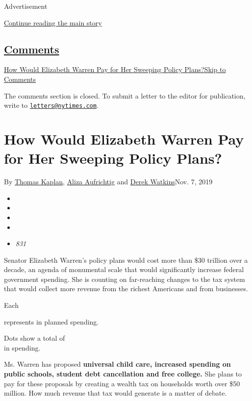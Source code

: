 Advertisement

\protect\hyperlink{after-top}{Continue reading the main story}

\hypertarget{comments}{%
\subsection{\texorpdfstring{\protect\hyperlink{commentsContainer}{Comments}}{Comments}}\label{comments}}

\href{}{How Would Elizabeth Warren Pay for Her Sweeping Policy
Plans?}\href{}{Skip to Comments}

The comments section is closed. To submit a letter to the editor for
publication, write to
\href{mailto:letters@nytimes.com}{\nolinkurl{letters@nytimes.com}}.

\hypertarget{how-would-elizabeth-warren-pay-for-her-sweeping-policy-plans}{%
\section{How Would Elizabeth Warren Pay for Her Sweeping Policy
Plans?}\label{how-would-elizabeth-warren-pay-for-her-sweeping-policy-plans}}

By \href{https://www.nytimes.com/by/thomas-kaplan}{Thomas Kaplan},
\href{https://www.nytimes.com/by/aliza-aufrichtig}{Aliza Aufrichtig} and
\href{https://www.nytimes.com/by/derek-watkins}{Derek Watkins}Nov. 7,
2019

\begin{itemize}
\item
\item
\item
\item
\item
  \emph{831}
\end{itemize}

Senator Elizabeth Warren's policy plans would cost more than \$30
trillion over a decade, an agenda of monumental scale that would
significantly increase federal government spending. She is counting on
far-reaching changes to the tax system that would collect more revenue
from the richest Americans and from businesses.

Each

represents in planned spending.

Dots show a total of\\
 in spending.

Ms. Warren has proposed \textbf{universal child care, increased spending
on public schools, student debt cancellation and free college.} She
plans to pay for these proposals by creating a wealth tax on households
worth over \$50 million. How much revenue that tax would generate is a
matter of debate.

